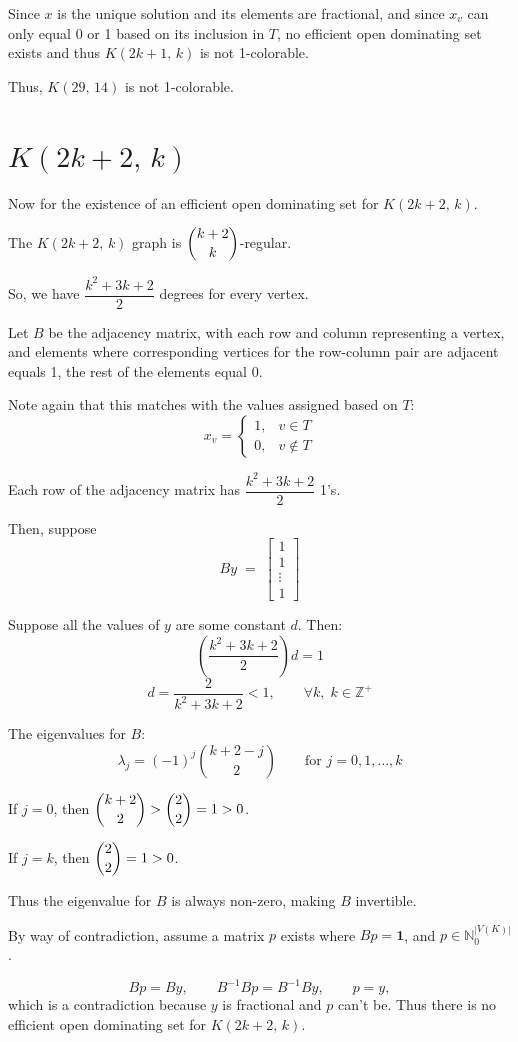 \documentclass[11pt]{article}
\begin{document}
Since $x$ is the unique solution and its elements are fractional, and since
$x_v$ can only equal 0 or 1 based on its inclusion in $T$, no efficient open
dominating set exists and thus $K(2k+1,\,k)$ is not 1-colorable.

Thus, $K(29,\,14)$ is not 1-colorable.

\section{$K(2k+2,\,k)$}

Now for the existence of an efficient open dominating set for $K(2k+2,\,k)$.

The $K(2k+2,\,k)$ graph is $\dbinom{k+2}{k}$-regular.

So, we have $\dfrac{k^2+3k+2}{2}$ degrees for every vertex.

Let $B$ be the adjacency matrix, with each row and column representing a
vertex, and elements where corresponding vertices for the row-column pair are
adjacent equals 1, the rest of the elements equal 0.

Note again that this matches with the values assigned based on $T$:
\[
  x_v =
  \begin{cases}
    1, & v \in T\\
    0, & v \notin T
  \end{cases}
\]

Each row of the adjacency matrix has $\dfrac{k^2+3k+2}{2}$ 1's.

Then, suppose
\[
  By \;=\; \begin{bmatrix} 1 \\ 1 \\ \vdots \\ 1 \end{bmatrix}
\]

Suppose all the values of $y$ are some constant $d$. Then:
\[
  \left( \frac{k^2+3k+2}{2} \right) d = 1
\]
\[
  d = \frac{2}{k^2+3k+2} < 1, \qquad \forall k,\; k \in \mathbb{Z}^{+}
\]

The eigenvalues for $B$:
\[
  \lambda_j = (-1)^j \binom{k+2-j}{2} \qquad \text{for } j = 0, 1, \dots, k
\]

If $j = 0$, then $\dbinom{k+2}{2} > \dbinom{2}{2} = 1 > 0$.

If $j = k$, then $\dbinom{2}{2} = 1 > 0$.

Thus the eigenvalue for $B$ is always non-zero, making $B$ invertible.

By way of contradiction, assume a matrix $p$ exists where $Bp = \mathbf{1}$,
and $p \in \mathbb{N}_0^{|V(K)|}$.

\[
  Bp = By, \qquad B^{-1}Bp = B^{-1}By, \qquad p = y,
\]
which is a contradiction because $y$ is fractional and $p$ can't be. Thus
there is no efficient open dominating set for $K(2k+2,\,k)$.
\end{document}

